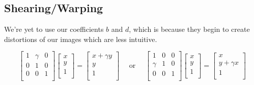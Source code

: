 \documentclass{article}
\begin{document}
\begin{figure}[!htbp]
    \centering
\end{figure}

\begin{figure}[!htbp]
    \centering
\end{figure}

\subsection{Shearing/Warping} 
We're yet to use our coefficients $ b $ and $ d $, which is because they begin
to create distortions of our images which are less intuitive.

\[%
    \begin{bmatrix} 
        1 & \gamma & 0 \\
		0 & 1 & 0 \\
		0 & 0 & 1 \\		
    \end{bmatrix}
    \begin{bmatrix}
        x \\
        y \\
		1 \\		
    \end{bmatrix}
    =
    \begin{bmatrix}
        x + \gamma y \\
        y \\
		1 \\		
    \end{bmatrix}
    \quad
    \text{ or }
    \quad
    \begin{bmatrix} 
        1 & 0 & 0 \\
		\gamma & 1 & 0 \\
		0 & 0 & 1 \\		
    \end{bmatrix}
    \begin{bmatrix}
        x \\
        y \\
		1 \\		
    \end{bmatrix}
    =
    \begin{bmatrix}
        x \\
        y + \gamma x \\
		1 \\		
    \end{bmatrix}
\]%
\end{document}
